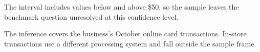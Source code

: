 The interval includes values below and above \$50, so the sample leaves the benchmark question unresolved at this confidence level.

The inference covers the business's October online card transactions. In-store transactions use a different processing system and fall outside the sample frame.



